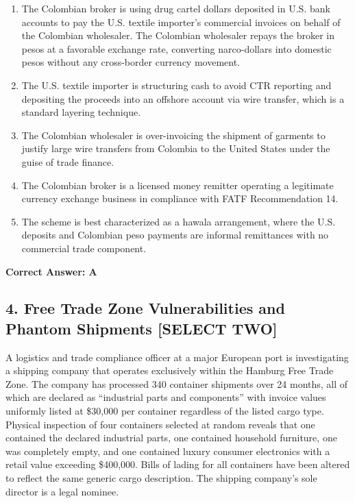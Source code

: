 \documentclass[11pt,a4paper]{article}
\begin{document}
	\begin{enumerate}[label=\Alph*.]
		\item The Colombian broker is using drug cartel dollars deposited in U.S. bank accounts to pay the U.S. textile importer's commercial invoices on behalf of the Colombian wholesaler. The Colombian wholesaler repays the broker in pesos at a favorable exchange rate, converting narco-dollars into domestic pesos without any cross-border currency movement.
		\item The U.S. textile importer is structuring cash to avoid CTR reporting and depositing the proceeds into an offshore account via wire transfer, which is a standard layering technique.
		\item The Colombian wholesaler is over-invoicing the shipment of garments to justify large wire transfers from Colombia to the United States under the guise of trade finance.
		\item The Colombian broker is a licensed money remitter operating a legitimate currency exchange business in compliance with FATF Recommendation 14.
		\item The scheme is best characterized as a hawala arrangement, where the U.S. deposits and Colombian peso payments are informal remittances with no commercial trade component.
	\end{enumerate}
	\textbf{Correct Answer: A}
	
	\subsection{4. Free Trade Zone Vulnerabilities and Phantom Shipments \textnormal{[SELECT TWO]}}
	
	A logistics and trade compliance officer at a major European port is investigating a shipping company that operates exclusively within the Hamburg Free Trade Zone. The company has processed 340 container shipments over 24 months, all of which are declared as ``industrial parts and components'' with invoice values uniformly listed at \$30,000 per container regardless of the listed cargo type. Physical inspection of four containers selected at random reveals that one contained the declared industrial parts, one contained household furniture, one was completely empty, and one contained luxury consumer electronics with a retail value exceeding \$400,000. Bills of lading for all containers have been altered to reflect the same generic cargo description. The shipping company's sole director is a legal nominee.
	
\end{document}
